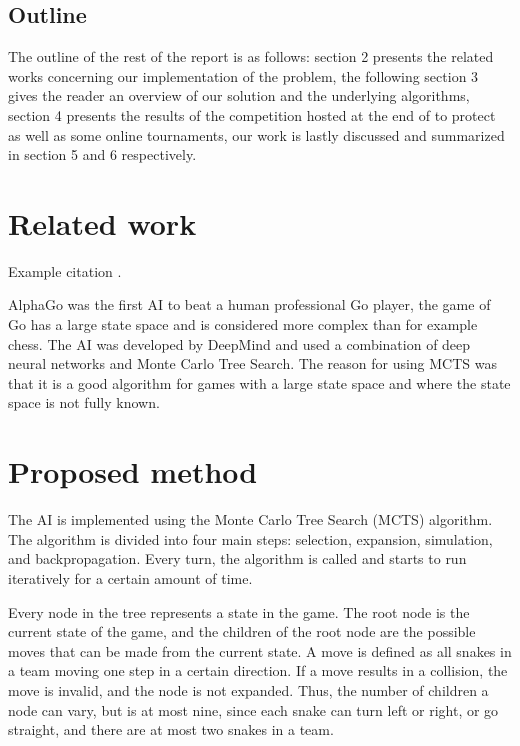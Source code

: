 \documentclass[a4paper,12pt]{article}
\begin{document}
\subsection{Outline}
The outline of the rest of the report is as follows: section 2 presents the related works concerning our implementation of the problem, the following section 3 gives the reader an overview of our solution and the underlying algorithms, section 4 presents the results of the competition hosted at the end of to protect as well as some online tournaments, our work is lastly discussed and summarized in section 5 and 6 respectively.


\newpage
\section{Related work}
\label{sec:relwork}

Example citation \cite{RussellNorvigAIBook3rd}.

AlphaGo was the first AI to beat a human professional Go player, the game of Go has a large state space and is considered more complex than for example chess. The AI was developed by DeepMind and used a combination of deep neural networks and Monte Carlo Tree Search. The reason for using MCTS was that it is a good algorithm for games with a large state space and where the state space is not fully known. %






\newpage
\section{Proposed method}
\label{sec:method}

The AI is implemented using the Monte Carlo Tree Search (MCTS) algorithm. The algorithm is divided into four main steps: selection, expansion, simulation, and backpropagation. Every turn, the algorithm is called and starts to run iteratively for a certain amount of time. 

Every node in the tree represents a state in the game. The root node is the current state of the game, and the children of the root node are the possible moves that can be made from the current state. A move is defined as all snakes in a team moving one step in a certain direction. If a move results in a collision, the move is invalid, and the node is not expanded. Thus, the number of children a node can vary, but is at most nine, since each snake can turn left or right, or go straight, and there are at most two snakes in a team. %
\end{document}
